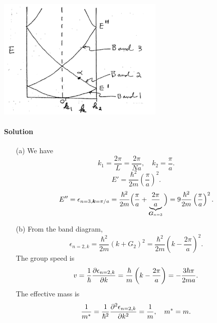 \documentclass[hyperref, a4paper]{article}
\begin{document}
\begin{center}
    \includegraphics[width=0.6\textwidth]{bands/free-electron-folding-1.PNG}
\end{center}

\paragraph{Solution} \begin{itemize}
\item[(a)] We have 
\begin{equation}
    k_1 = \frac{2\pi}{L} = \frac{2\pi}{Na}, \quad 
    k_2 = \frac{\pi}{a}.
\end{equation}
\begin{equation}
    E' = \frac{\hbar^2}{2m} \left(\frac{\pi}{a}\right)^2.
\end{equation}
\begin{equation}
    E'' = \epsilon_{n = 3, \vb*{k} = \pi / a} = \frac{\hbar^2}{2m} \Big( 
        \frac{\pi}{a} + \underbrace{\frac{2\pi}{a}}_{\vb*{G}_{n = 3}} \Big)
        = 9 \frac{\hbar^2}{2m} \left(\frac{\pi}{a}\right)^2.
\end{equation}

\item[(b)] From the band diagram, 
\begin{equation}
    \epsilon_{n = 2, k} = \frac{\hbar^2}{2m} (k + G_2)^2 
    = \frac{\hbar^2}{2m} \left( k - \frac{2\pi}{a} \right)^2.
\end{equation}
The group speed is 
\begin{equation}
    v = \frac{1}{\hbar} \pdv{\epsilon_{n = 2, k}}{k} = \frac{\hbar}{m} \left( k - \frac{2\pi}{a} \right)
    = - \frac{3 \hbar \pi}{2 m a}.
\end{equation}
The effective mass is 
\begin{equation}
    \frac{1}{m^*} = \frac{1}{\hbar^2} \pdv[2]{\epsilon_{n = 2, k}}{k}
    = \frac{1}{m}, \quad m^* = m.
\end{equation}


\end{itemize}
\end{document}
